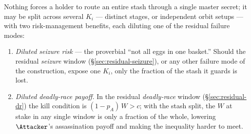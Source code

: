 \begin{remark}\label{rem:splitting}
Nothing forces a holder to route an entire stash through a single master secret; it
may be split across several $K_i$ --- distinct stages, or independent orbit setups
--- with two risk-management benefits, each diluting one of the residual failure
modes:
\begin{enumerate}[nosep,leftmargin=1.6em]
  \item \emph{Diluted seizure risk} --- the proverbial ``not all eggs in one
        basket.'' Should the residual \emph{seizure} window
        (\S\ref{sec:residual-seizure}), or any other failure mode of the
        construction, expose one $K_i$, only the fraction of the stash it guards is
        lost.
  \item \emph{Diluted deadly-race payoff.} In the residual \emph{deadly-race}
        window (\S\ref{sec:residual-dr}) the kill condition is $(1-p_A)\,W > c$;
        with the stash split, the $W$ at stake in any single window is only a
        fraction of the whole, lowering $\Attacker$'s assassination payoff and
        making the inequality harder to meet.
\end{enumerate}
\end{remark}
